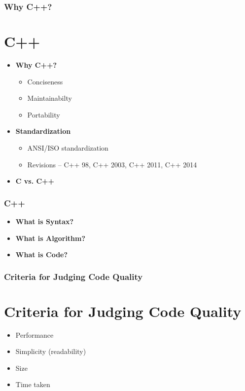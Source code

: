 \documentclass{beamer}
\begin{document}
\begin{frame}
    \frametitle{Why C++?}
    \section{C++} %
    \label{sec:why_c}
    \begin{itemize}
        \item \textbf{Why C++?}
            \begin{itemize}
                \item Conciseness
                \item Maintainabilty
                \item Portability
            \end{itemize}
        \item \textbf{Standardization}
            \begin{itemize}
                \item ANSI/ISO standardization
                \item Revisions -- C++ 98, C++ 2003, C++ 2011, C++ 2014
            \end{itemize}
        \item \textbf{C vs. C++}
    \end{itemize}
\end{frame}

\begin{frame}
    \frametitle{C++}
    \begin{itemize}
        \item \textbf{What is Syntax?}
        \item \textbf{What is Algorithm?}
        \item \textbf{What is Code?}
    \end{itemize}
\end{frame}

\begin{frame}
    \frametitle{Criteria for Judging Code Quality}
    \section{Criteria for Judging Code Quality} %
    \label{sec:criteria_for_judging_code_quality}
    \begin{itemize}
        \item Performance
        \item Simplicity (readability)
        \item Size
        \item Time taken
    \end{itemize}
\end{frame}
\end{document}
